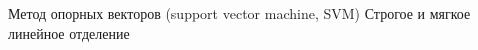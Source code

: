 \SPBGSectionSlide
  {{Метод опорных векторов (support vector machine, SVM)}}
  {Строгое и мягкое линейное отделение}
